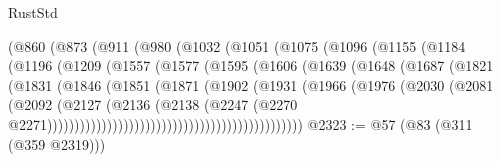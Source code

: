 \begin{lexlean}{RustStd}
\begin{coremodule}
                          (@860
                            (@873
                              (@911
                                (@980
                                  (@1032
                                    (@1051
                                      (@1075
                                        (@1096
                                          (@1155
                                            (@1184
                                              (@1196
                                                (@1209
                                                  (@1557
                                                    (@1577
                                                      (@1595
                                                        (@1606
                                                          (@1639
                                                            (@1648
                                                              (@1687
                                                                (@1821
                                                                  (@1831
                                                                    (@1846
                                                                      (@1851
                                                                        (@1871
                                                                          (@1902
                                                                            (@1931
                                                                              (@1966
                                                                                (@1976
                                                                                  (@2030
                                                                                    (@2081
                                                                                      (@2092
                                                                                        (@2127
                                                                                          (@2136
                                                                                            (@2138
                                                                                              (@2247
                                                                                                (@2270
                                                                                                  @2271)))))))))))))))))))))))))))))))))))))))))))))))
@2323 := @57 (@83 (@311 (@359 @2319)))

\end{coremodule}
\end{lexlean}
